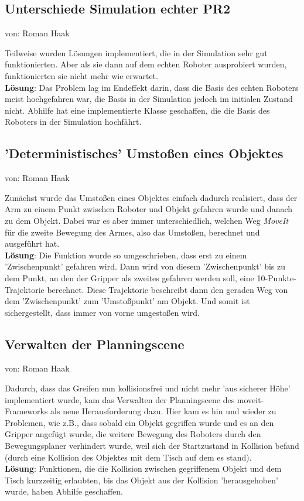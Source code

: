 \documentclass{suturo}
\makeatletter
\newcommand{\chapterauthor}[1]{%
  {\parindent0pt\vspace*{-27pt}%
  \linespread{0}\small\begin{flushright}von: #1\end{flushright}%
  \par\nobreak\vspace*{0pt}}
  \@afterheading%
}
\makeatother
\begin{document}
\subsection{Unterschiede Simulation echter PR2}
\chapterauthor{Roman Haak}
Teilweise wurden Lösungen implementiert, die in der Simulation sehr gut funktionierten. Aber als sie dann auf dem echten Roboter ausprobiert wurden,
funktionierten sie nicht mehr wie erwartet.\\
\textbf{Lösung}: Das Problem lag im Endeffekt darin, dass die Basis des echten Roboters meist hochgefahren war, die Basis in der Simulation jedoch im initialen Zustand nicht. Abhilfe hat eine implementierte Klasse geschaffen, die die Basis des Roboters in der Simulation hochfährt.

\subsection{'Deterministisches' Umstoßen eines Objektes}
\chapterauthor{Roman Haak}
Zunächst wurde das Umstoßen eines Objektes einfach dadurch realisiert, dass der Arm zu einem Punkt zwischen Roboter und Objekt gefahren wurde und danach zu dem Objekt. Dabei war es aber immer unterschiedlich, welchen Weg \textit{MoveIt} für die zweite Bewegung des Armes, also das Umstoßen, berechnet und ausgeführt hat.\\
\textbf{Lösung}: Die Funktion wurde so umgeschrieben, dass erst zu einem 'Zwischenpunkt' gefahren wird. Dann wird von diesem 'Zwischenpunkt' bis zu dem Punkt, an den der Gripper als zweites gefahren werden soll, eine 10-Punkte-Trajektorie berechnet. Diese Trajektorie beschreibt dann den geraden Weg von dem 'Zwischenpunkt' zum 'Umstoßpunkt' am Objekt. Und somit ist sichergestellt, dass immer von vorne umgestoßen wird.

\subsection{Verwalten der Planningscene}
\chapterauthor{Roman Haak}
Dadurch, dass das Greifen nun kollisionsfrei und nicht mehr 'aus sicherer Höhe' implementiert wurde, kam das Verwalten der Planningscene des moveit-Frameworks als neue Herausforderung dazu. Hier kam es hin und wieder zu Problemen, wie z.B., dass sobald ein Objekt gegriffen wurde und es an den Gripper angefügt wurde, die weitere Bewegung des Roboters durch den Bewegungsplaner verhindert wurde, weil sich der Startzustand in Kollision befand (durch eine Kollision des Objektes mit dem Tisch auf dem es stand).\\
\textbf{Lösung}: Funktionen, die die Kollision zwischen gegriffenem Objekt und dem Tisch kurzzeitig erlaubten, bis das Objekt aus der Kollision 'herausgehoben' wurde, haben Abhilfe geschaffen.
\end{document}
